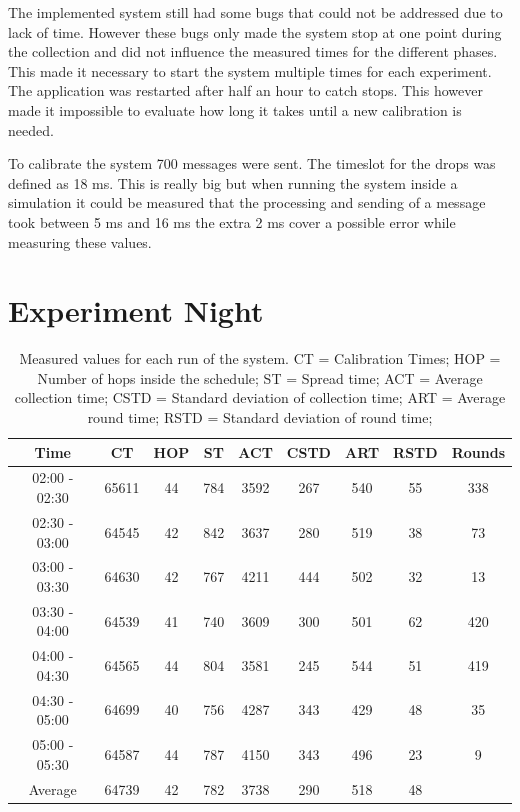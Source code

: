 The implemented system still had some bugs that could not be addressed due to lack of time. However these bugs only made the system stop at one point during the collection and did not influence the measured times for the different phases. This made it necessary to start the system multiple times for each experiment. The application was restarted after half an hour to catch stops. This however made it impossible to evaluate how long it takes until a new calibration is needed.

To calibrate the system 700 messages were sent. The timeslot for the drops was defined as 18 ms. This is really big but when running the system inside a simulation it could be measured that the processing and sending of a message took between 5 ms and 16 ms the extra 2 ms cover a possible error while measuring these values.  
\section{Experiment Night}
\begin{table}[htbp]
 \caption{Measured values for each run of the system. CT = Calibration Times; HOP = Number of hops inside the schedule; ST = Spread time; ACT = Average collection time; CSTD = Standard deviation of collection time; ART = Average round time; RSTD = Standard deviation of round time;}
 \centering
 \begin{tabular}{c||c|c|c|c|c|c|c|c}
  Time & CT & HOP & ST & ACT & CSTD & ART & RSTD & Rounds\\ \toprule
  02:00 - 02:30 & 65611 & 44 & 784 & 3592 & 267 & 540 & 55 & 338\\
  02:30 - 03:00 & 64545 & 42 & 842 & 3637 & 280 & 519 & 38 & 73\\
  03:00 - 03:30 & 64630 & 42 & 767 & 4211 & 444 & 502 & 32 & 13\\
  03:30 - 04:00 & 64539 & 41 & 740 & 3609 & 300 & 501 & 62 & 420\\
  04:00 - 04:30 & 64565 & 44 & 804 & 3581 & 245 & 544 & 51 & 419\\
  04:30 - 05:00 & 64699 & 40 & 756 & 4287 & 343 & 429 & 48 & 35\\
  05:00 - 05:30 & 64587 & 44 & 787 & 4150 & 343 & 496 & 23 & 9\\ \toprule
  Average & 64739 & 42 & 782 & 3738 & 290 & 518 & 48 & \\
 \end{tabular}
 \label{tab:NightTable}
\end{table}

